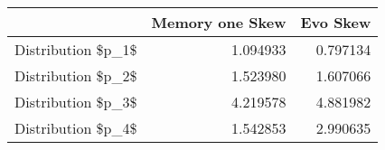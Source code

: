 \begin{tabular}{lrr}
\toprule
{} &  Memory one Skew &  Evo Skew \\
\midrule
Distribution \$p\_1\$ &         1.094933 &  0.797134 \\
Distribution \$p\_2\$ &         1.523980 &  1.607066 \\
Distribution \$p\_3\$ &         4.219578 &  4.881982 \\
Distribution \$p\_4\$ &         1.542853 &  2.990635 \\
\bottomrule
\end{tabular}
